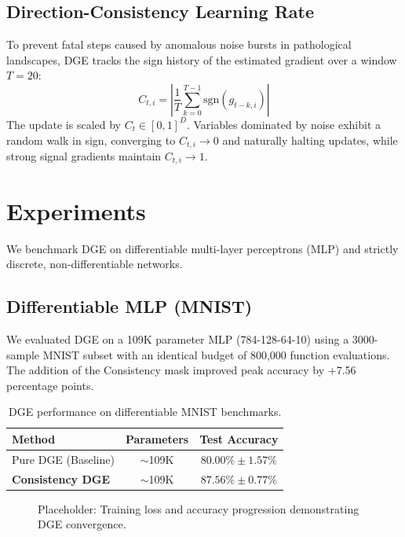 \documentclass[11pt, a4paper]{article}
\begin{document}
\subsection{Direction-Consistency Learning Rate}
To prevent fatal steps caused by anomalous noise bursts in pathological landscapes, DGE tracks the sign history of the estimated gradient over a window $T=20$:
\begin{equation}
    C_{t,i} = \left| \frac{1}{T} \sum_{k=0}^{T-1} \text{sgn}(g_{t-k, i}) \right|
\end{equation}
The update is scaled by $C_t \in [0, 1]^D$. Variables dominated by noise exhibit a random walk in sign, converging to $C_{t,i} \rightarrow 0$ and naturally halting updates, while strong signal gradients maintain $C_{t,i} \rightarrow 1$.

\section{Experiments}
We benchmark DGE on differentiable multi-layer perceptrons (MLP) and strictly discrete, non-differentiable networks.

\subsection{Differentiable MLP (MNIST)}
We evaluated DGE on a 109K parameter MLP (784-128-64-10) using a 3000-sample MNIST subset with an identical budget of 800,000 function evaluations. The addition of the Consistency mask improved peak accuracy by +7.56 percentage points.

\begin{table}[h]
\centering
\begin{tabular}{@{}lcc@{}}
\toprule
\textbf{Method} & \textbf{Parameters} & \textbf{Test Accuracy} \\ \midrule
Pure DGE (Baseline) & $\sim$109K & $80.00\% \pm 1.57\%$ \\
\textbf{Consistency DGE} & $\sim$109K & $\mathbf{87.56\% \pm 0.77\%}$ \\ \bottomrule
\end{tabular}
\caption{DGE performance on differentiable MNIST benchmarks.}
\end{table}

\begin{figure}[h]
    \centering
    \fbox{\rule{0pt}{2in} \rule{0.9\linewidth}{0pt}}
    \caption{Placeholder: Training loss and accuracy progression demonstrating DGE convergence.}
\end{figure}
\end{document}
